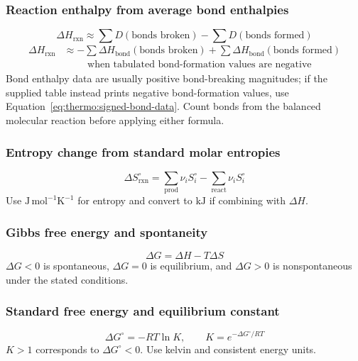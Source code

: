 \subsubsection{Reaction enthalpy from average bond enthalpies}
\begin{equation}
\Delta H_{\mathrm{rxn}}\approx
\sum D(\text{bonds broken})-\sum D(\text{bonds formed})
\label{eq:thermo:bond-enthalpy-estimate}
\end{equation}
\begin{equation}
\begin{aligned}
\Delta H_{\mathrm{rxn}}&\approx
-\sum \Delta H_{\mathrm{bond}}(\text{bonds broken})
+\sum \Delta H_{\mathrm{bond}}(\text{bonds formed})\\
&\hspace{1cm}\text{when tabulated bond-formation values are negative}
\end{aligned}
\label{eq:thermo:signed-bond-data}
\end{equation}
Bond enthalpy data are usually positive bond-breaking magnitudes; if the supplied table instead prints negative bond-formation values, use Equation~\eqref{eq:thermo:signed-bond-data}. Count bonds from the balanced molecular reaction before applying either formula.

\subsubsection{Entropy change from standard molar entropies}
\begin{equation}
\Delta S^\circ_{\mathrm{rxn}}=
\sum_{\mathrm{prod}}\nu_iS^\circ_i-\sum_{\mathrm{react}}\nu_iS^\circ_i
\label{eq:thermo:reaction-entropy}
\end{equation}
Use \(\mathrm{J\,mol^{-1}K^{-1}}\) for entropy and convert to \(\mathrm{kJ}\) if combining with \(\Delta H\).

\subsubsection{Gibbs free energy and spontaneity}
\begin{equation}
\Delta G=\Delta H-T\Delta S
\label{eq:thermo:gibbs}
\end{equation}
\(\Delta G<0\) is spontaneous, \(\Delta G=0\) is equilibrium, and \(\Delta G>0\) is nonspontaneous under the stated conditions.

\subsubsection{Standard free energy and equilibrium constant}
\begin{equation}
\Delta G^\circ=-RT\ln K, \qquad K=e^{-\Delta G^\circ/RT}
\label{eq:thermo:equilibrium-constant}
\end{equation}
\(K>1\) corresponds to \(\Delta G^\circ<0\). Use kelvin and consistent energy units.


